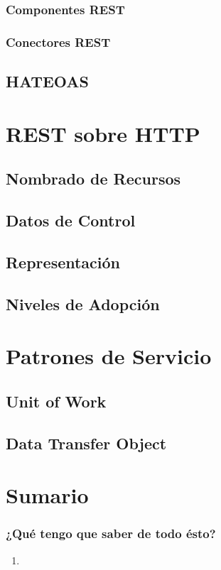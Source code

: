 \documentclass[a4paper,slidestop,xcolor=pst,blue]{beamer}
\begin{document}
\begin{frame}
    \frametitle{Componentes REST}
    

\end{frame}

\begin{frame}
    \frametitle{Conectores REST}



\end{frame}

\subsection{HATEOAS}

\section{REST sobre HTTP}

\subsection{Nombrado de Recursos}

\subsection{Datos de Control}

\subsection{Representación} 

\subsection{Niveles de Adopción}

\section{Patrones de Servicio}

\subsection{Unit of Work}

\subsection{Data Transfer Object}

\section{Sumario}

\begin{frame}[c]
    \frametitle{¿Qué tengo que saber de todo ésto?}
    \begin{enumerate}[<+->]
        \item
    \end{enumerate}
\end{frame}
\end{document}
